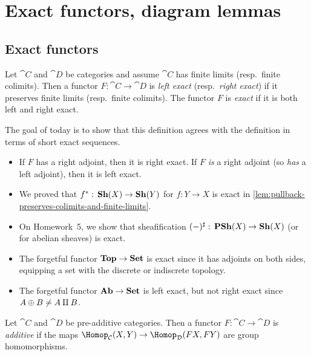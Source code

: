 \chapter{Exact functors, diagram lemmas}

\section{Exact functors}
\noindent
\begin{defn}
Let \(\cat C\) and \(\cat D\) be categories and assume \(\cat C\) has finite limits (resp.~finite colimits).
Then a functor \(F\colon\cat C\to\cat D\) is \emph{left exact} (resp.~\emph{right exact}) if it preserves finite limits (resp.~finite colimits).
The functor \(F\) is \emph{exact} if it is both left and right exact.
\end{defn}

The goal of today is to show that this definition agrees with the definition in terms of short exact sequences.

\begin{exmp}\label{exmp:exact-functors}
\begin{itemize}
\item 
  If \(F\) has a right adjoint, then it is right exact.
  If \(F\) \emph{is} a right adjoint (so \emph{has} a left adjoint), then it is left exact.
\item
  We proved that \(f^*\colon\catSheaf(X)\to\catSheaf(Y)\) for \(f\colon Y\to X\) is exact in \cref{lem:pullback-preserves-colimits-and-finite-limits}.
\item
  On Homework~5, we show that sheafification \((-)^\sharp\colon\catPresheaf(X)\to\catSheaf(X)\) (or for abelian sheaves) is exact.
\item
  The forgetful functor \(\mathbf{Top}\to\mathbf{Set}\) is exact since it has adjoints on both sides, equipping a set with the discrete or indiscrete topology.
\item
  The forgetful functor \(\mathbf{Ab}\to\mathbf{Set}\) is left exact, but not right exact since \(A\oplus B\neq A\amalg B\).
\end{itemize}
\end{exmp}

\begin{defn}
Let \(\cat C\) and \(\cat D\) be pre-additive categories.
Then a functor \(F\colon\cat C\to\cat D\) is \emph{additive} if the maps \(\Hom[\cat C](X,Y)\to\Hom[\cat D](FX,FY)\) are group homomorphisms.
\end{defn}


